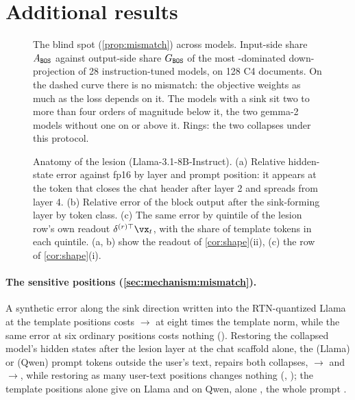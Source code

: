 \section{Additional results}
\label{app:extra}
\begin{figure}[t]
\begin{center}
\end{center}
\caption{The blind spot (\cref{prop:mismatch}) across models. Input-side share $A_{\texttt{BOS}}$ against output-side share $G_{\texttt{BOS}}$ of the most \bos{}-dominated down-projection of 28 instruction-tuned models, on 128 C4 documents. On the dashed curve there is no mismatch: the objective weights \bos{} as much as the loss depends on it. The \nSink{} models with a sink sit two to more than four orders of magnitude below it, the two gemma-2 models without one on or above it. Rings: the two collapses under this protocol.}
\label{fig:ag}
\end{figure}
\begin{figure}[t]
\begin{center}
\end{center}
\caption{Anatomy of the lesion (Llama-3.1-8B-Instruct). (a) Relative
hidden-state error against fp16 by layer and prompt position: it appears at the
token that closes the chat header after layer 2 and spreads from layer 4.
(b) Relative error of the block output after the sink-forming layer by token
class. (c) The same error by quintile of the lesion row's own readout
$\delta^{(r)\top}\vx_t$, with the share of template tokens in each quintile.
(a, b) show the readout of \cref{cor:shape}(ii), (c) the row of \cref{cor:shape}(i).}
\label{fig:lesion}
\end{figure}














\paragraph{The sensitive positions (\cref{sec:mechanism:mismatch}).}
A synthetic error along the sink direction written into the RTN-quantized Llama at the template positions costs \LrtnIF{}$\to$\InjTplEight{} at eight times the template norm, while the same error at six ordinary positions costs nothing (\InjOrdEight{}).
Restoring the collapsed model's hidden states after the lesion layer at the chat scaffold alone, the \nScafL{} (Llama) or \nScafQ{} (Qwen) prompt tokens outside the user's text, repairs both collapses, \LgptqIF{}$\to$\PatchScaf{} and \QgptqIF{}$\to$\QPatchScaf{}, while restoring as many user-text positions changes nothing (\PatchContent{}, \QPatchContent{}); the template positions alone give \PatchTpl{} on Llama and \QPatchTpl{} on Qwen, \bos{} alone \PatchBos{}, the whole prompt \PatchAll{}.
